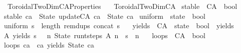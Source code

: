 %
\begin{isabellebody}%
%
%
\isadelimdocument
%
\endisadelimdocument
%
\isatagdocument
%
\isamarkuptrue%
%
\endisatagdocument
{\isafolddocument}%
%
\isadelimdocument
%
\endisadelimdocument
%
\isadelimtheory
%
\endisadelimtheory
%
\isatagtheory
{}\isamarkupfalse%
\ Toroidal{\isacharunderscore}TwoDim{\isacharunderscore}CA{\isacharunderscore}Properties\isanewline
\ \ \ Toroidal{\isacharunderscore}TwoDim{\isacharunderscore}CA\isanewline
{}%
\endisatagtheory
{\isafoldtheory}%
%
\isadelimtheory
\isanewline
%
\endisadelimtheory
\isanewline
{}\isamarkupfalse%
\ stable\ {\isacharcolon}{\isacharcolon}\ {\isachardoublequoteopen}CA\ {\isasymRightarrow}\ bool{\isachardoublequoteclose}\ \isanewline
{\isachardoublequoteopen}stable\ ca\ {\isasymequiv}\ State\ {\isacharparenleft}update{\isacharunderscore}CA\ ca{\isacharparenright}\ {\isacharequal}\ State\ ca{\isachardoublequoteclose}\isanewline
\isanewline
{}\isamarkupfalse%
\ uniform\ {\isacharcolon}{\isacharcolon}\ {\isachardoublequoteopen}state\ {\isasymRightarrow}\ bool{\isachardoublequoteclose}\ \isanewline
{\isachardoublequoteopen}uniform\ s\ {\isasymequiv}\ length\ {\isacharparenleft}remdups\ {\isacharparenleft}concat\ s{\isacharparenright}{\isacharparenright}\ {\isacharequal}\ {}{\isachardoublequoteclose}\isanewline
\isanewline
{}\isamarkupfalse%
\ yields\ {\isacharcolon}{\isacharcolon}\ {\isachardoublequoteopen}CA\ {\isasymRightarrow}\ state\ {\isasymRightarrow}\ bool{\isachardoublequoteclose}\ {\isacharparenleft}\ {\isacartoucheopen}yields{\isacartoucheclose}\ \ {}{}{\isacharparenright}\ \isanewline
{\isachardoublequoteopen}A\ yields\ s\ {\isasymequiv}\ {\isacharparenleft}{\isasymexists}\ n{\isachardot}\ State\ {\isacharparenleft}run{\isacharunderscore}t{\isacharunderscore}steps\ A\ n{\isacharparenright}\ {\isacharequal}\ s\ {\isasymand}\ n\ {\isachargreater}\ {}{\isacharparenright}{\isachardoublequoteclose}\isanewline
\isanewline
{}\isamarkupfalse%
\ loops\ {\isacharcolon}{\isacharcolon}\ {\isachardoublequoteopen}CA\ {\isasymRightarrow}\ bool{\isachardoublequoteclose}\ \isanewline
{\isachardoublequoteopen}loops\ ca\ {\isasymequiv}\ ca\ yields\ State\ ca{\isachardoublequoteclose}\isanewline

\end{isabellebody}
